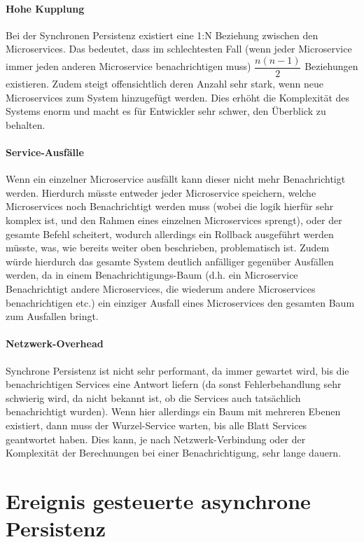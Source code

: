 \paragraph{Hohe Kupplung}
Bei der Synchronen Persistenz existiert eine 1:N Beziehung zwischen den Microservices. Das bedeutet, dass im schlechtesten Fall (wenn jeder Microservice immer jeden anderen Microservice benachrichtigen muss) $\dfrac{n(n-1)}{2}$
Beziehungen existieren. Zudem steigt offensichtlich deren Anzahl sehr stark, wenn neue Microservices zum System hinzugefügt werden. Dies erhöht die Komplexität des Systems enorm und macht es für Entwickler sehr schwer, den Überblick zu behalten.

\paragraph{Service-Ausfälle}
Wenn ein einzelner Microservice ausfällt kann dieser nicht mehr Benachrichtigt werden. Hierdurch müsste entweder jeder Microservice speichern, welche Microservices noch Benachrichtigt werden muss (wobei die logik hierfür sehr komplex ist, und den Rahmen eines einzelnen Microservices sprengt), oder der gesamte Befehl scheitert, wodurch allerdings ein Rollback ausgeführt werden müsste, was, wie bereits weiter oben beschrieben, problematisch ist. Zudem würde hierdurch das gesamte System deutlich anfälliger gegenüber Ausfällen werden, da in einem Benachrichtigungs-Baum (d.h. ein Microservice Benachrichtigt andere Microservices, die wiederum andere Microservices benachrichtigen etc.) ein einziger Ausfall eines Microservices den gesamten Baum zum Ausfallen bringt.

\paragraph{Netzwerk-Overhead}
Synchrone Persistenz ist nicht sehr performant, da immer gewartet wird, bis die benachrichtigen Services eine Antwort liefern (da sonst Fehlerbehandlung sehr schwierig wird, da nicht bekannt ist, ob die Services auch tatsächlich benachrichtigt wurden). Wenn hier allerdings ein Baum mit mehreren Ebenen existiert, dann muss der Wurzel-Service warten, bis alle Blatt Services geantwortet haben. Dies kann, je nach Netzwerk-Verbindung oder der Komplexität der Berechnungen bei einer Benachrichtigung, sehr lange dauern.

\section{Ereignis gesteuerte asynchrone Persistenz}

